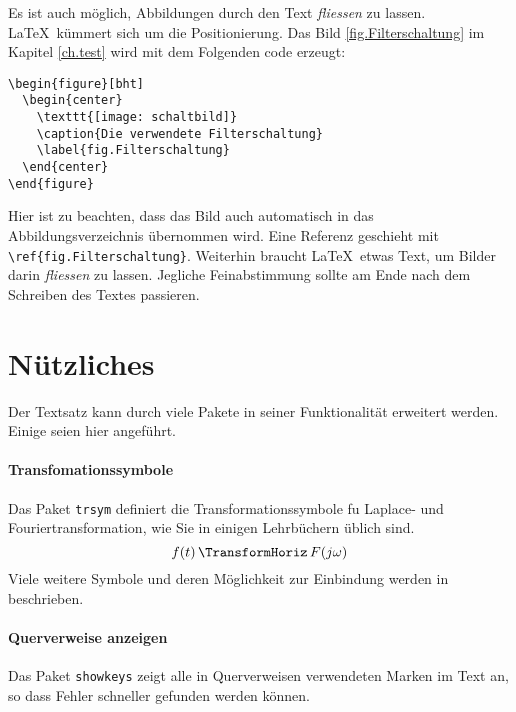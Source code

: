 Es ist auch möglich, Abbildungen durch den Text \emph{fliessen} zu
lassen. \LaTeX\ kümmert sich um die Positionierung. Das Bild
\ref{fig.Filterschaltung} im Kapitel
\ref{ch.test} wird mit dem Folgenden code erzeugt:

\begin{lstlisting}
\begin{figure}[bht]
  \begin{center}
    \texttt{[image: schaltbild]}
    \caption{Die verwendete Filterschaltung}
    \label{fig.Filterschaltung}
  \end{center}
\end{figure}
\end{lstlisting}

Hier ist zu  beachten, dass das Bild auch  automatisch in das Abbildungsverzeichnis
übernommen  wird.  Eine  Referenz  geschieht mit  \verb|\ref{fig.Filterschaltung}|.
Weiterhin braucht  \LaTeX\ etwas Text,  um Bilder darin \emph{fliessen}  zu lassen.
Jegliche Feinabstimmung sollte am Ende nach dem Schreiben des Textes passieren.


\section{Nützliches}

Der Textsatz kann durch viele Pakete in seiner Funktionalität erweitert
werden. Einige seien hier angeführt.

\paragraph{Transfomationssymbole}
Das Paket \texttt{trsym} definiert die Transformationssymbole fu Laplace- und
Fouriertransformation, wie Sie in einigen Lehrbüchern üblich sind.
\begin{equation}
  f(t)\,\TransformHoriz\,F(j\omega)
\end{equation} 
Viele   weitere  Symbole   und   deren  Möglichkeit   zur   Einbindung  werden   in
\cite{latex.symbols} beschrieben.

\paragraph{Querverweise anzeigen}
Das Paket \texttt{showkeys} zeigt alle  in Querverweisen verwendeten Marken im Text
an, so dass Fehler schneller gefunden werden können. 


